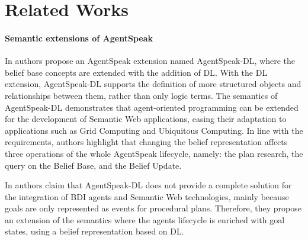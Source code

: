 \documentclass[
]{ceurart}
\begin{document}
\section{Related Works}
\label{sec:related-works}



\paragraph{Semantic extensions of AgentSpeak}
In \cite{DBLP:conf/dalt/MoreiraVBH05} authors propose an AgentSpeak extension named AgentSpeak-DL, 
where the belief base concepts are extended with the addition of \ac{DL}.
%
With the \ac{DL} extension, 
AgentSpeak-DL supports the definition of more structured objects and relationships between them, 
rather than only logic terms.
%
The semantics of AgentSpeak-DL demonstrates that agent-oriented programming can be extended for the development of Semantic Web applications, 
easing their adaptation to applications such as Grid Computing and Ubiquitous Computing.
%
In line with the requirements, 
authors highlight that changing the belief representation affects three operations of the whole AgentSpeak lifecycle, namely: the plan research, the query on the Belief Base, and the Belief Update.
%

In \cite{DBLP:conf/iat/HalacED11} authors claim that AgentSpeak-DL does not provide a complete solution for the integration of \ac{BDI} agents and Semantic Web technologies,
mainly because goals are only represented as events for procedural plans.
%
Therefore, 
they propose an extension of the semantics where the agents lifecycle is enriched with goal states,
using a belief representation based on \ac{DL}.
\end{document}
